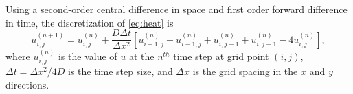 \documentclass[11pt]{article}
\begin{document}
    Using a second-order central difference in space and first order forward difference in time, the discretization of \eqref{eq:heat} is
    \begin{equation}
      u_{i,j}^{\left(n+1\right)} = u_{i,j}^{\left(n\right)} + \frac{D \Delta t}{\Delta x^2} 
        \left[u_{i+1, j}^{\left(n\right)} +
              u_{i-1, j}^{\left(n\right)} +
              u_{i, j+1}^{\left(n\right)} +
              u_{i, j-1}^{\left(n\right)} -
              4u_{i, j}^{\left(n\right)} \right],
    \end{equation}
    where \(u_{i,j}^{\left(n\right)}\) is the value of \(u\) at the \(n^{th}\) time step at grid point \((i,j)\), \(\Delta t = \Delta x^2 / 4D\) is the time step size, and \(\Delta x\) is the grid spacing in the \(x\) and \(y\) directions.
    
    \vspace{5mm}
    
\end{document}
